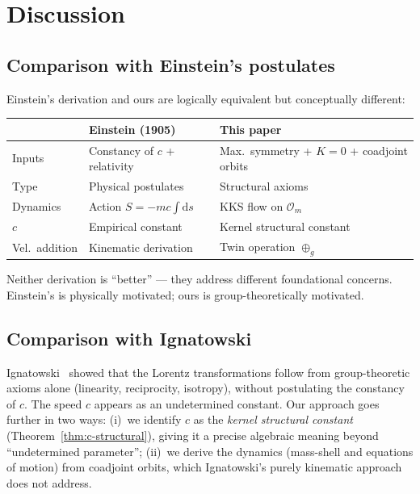 \documentclass[12pt]{article}
\theoremstyle{plain}
\theoremstyle{definition}
\theoremstyle{remark}
\newcommand{\dd}{\mathrm{d}}
\begin{document}
\section{Discussion}
\label{sec:discussion}

\subsection{Comparison with Einstein's postulates}

Einstein's derivation and ours are logically equivalent but conceptually different:

\begin{center}\small
\begin{tabular}{lll}\toprule
& \textbf{Einstein (1905)} & \textbf{This paper} \\\midrule
Inputs & Constancy of $c$ + relativity & Max.\ symmetry + $K = 0$ + coadjoint orbits \\
Type & Physical postulates & Structural axioms \\
Dynamics & Action $S = -mc\int\dd s$ & KKS flow on $\mathcal{O}_m$ \\
$c$ & Empirical constant & Kernel structural constant \\
Vel.\ addition & Kinematic derivation & Twin operation $\oplus_g$ \\
\bottomrule
\end{tabular}
\end{center}

Neither derivation is ``better'' --- they address different foundational concerns. Einstein's is physically motivated; ours is group-theoretically motivated.

\subsection{Comparison with Ignatowski}

Ignatowski~\cite{ignatowski1910} showed that the Lorentz transformations follow from group-theoretic axioms alone (linearity, reciprocity, isotropy), without postulating the constancy of $c$. The speed $c$ appears as an undetermined constant. Our approach goes further in two ways: (i)~we identify $c$ as the \emph{kernel structural constant} (Theorem~\ref{thm:c-structural}), giving it a precise algebraic meaning beyond ``undetermined parameter''; (ii)~we derive the dynamics (mass-shell and equations of motion) from coadjoint orbits, which Ignatowski's purely kinematic approach does not address.
\end{document}

